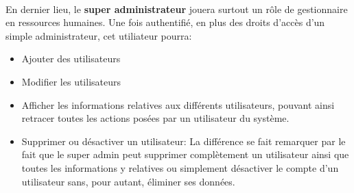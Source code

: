 \paragraph{}
En dernier lieu, le \textbf{super administrateur} jouera surtout un rôle de gestionnaire en ressources 
humaines. Une fois authentifié, en plus des droits d'accès d'un simple administrateur, 
cet utiliateur pourra:
\begin{itemize}
    \item Ajouter des utilisateurs
    \item Modifier les utilisateurs
    \item Afficher les informations relatives aux différents utilisateurs, pouvant 
    ainsi retracer toutes les actions posées par un utilisateur du système.
    \item Supprimer ou désactiver un utilisateur: La différence se fait remarquer 
    par le fait que le super admin peut supprimer complètement un utilisateur ainsi 
    que toutes les informations y relatives ou simplement désactiver le compte d'un 
    utilisateur sans, pour autant, éliminer ses données.
\end{itemize}
